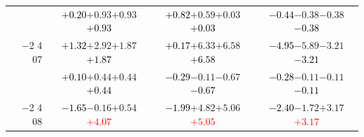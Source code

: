 \documentclass[compress]{beamer}
\begin{document}
\begin{frame}
\begin{tabular}{r | c | c | c}
          & \textcolor{black}{$+0.20$}\hspace{0.1 cm}$+0.93$\hspace{0.1 cm}$+0.93$\hspace{0.1 cm}\textcolor{black}{$+0.93$} & \textcolor{black}{$+0.82$}\hspace{0.1 cm}$+0.59$\hspace{0.1 cm}$+0.03$\hspace{0.1 cm}\textcolor{black}{$+0.03$} & \textcolor{black}{$-0.44$}\hspace{0.1 cm}$-0.38$\hspace{0.1 cm}$-0.38$\hspace{0.1 cm}\textcolor{black}{$-0.38$} \\
$-$2 4 07 & \textcolor{black}{$+1.32$}\hspace{0.1 cm}$+2.92$\hspace{0.1 cm}$+1.87$\hspace{0.1 cm}\textcolor{black}{$+1.87$} & \textcolor{black}{$+0.17$}\hspace{0.1 cm}$+6.33$\hspace{0.1 cm}$+6.58$\hspace{0.1 cm}\textcolor{black}{$+6.58$} & \textcolor{black}{$-4.95$}\hspace{0.1 cm}$-5.89$\hspace{0.1 cm}$-3.21$\hspace{0.1 cm}\textcolor{black}{$-3.21$} \\
          & \textcolor{black}{$+0.10$}\hspace{0.1 cm}$+0.44$\hspace{0.1 cm}$+0.44$\hspace{0.1 cm}\textcolor{black}{$+0.44$} & \textcolor{black}{$-0.29$}\hspace{0.1 cm}$-0.11$\hspace{0.1 cm}$-0.67$\hspace{0.1 cm}\textcolor{black}{$-0.67$} & \textcolor{black}{$-0.28$}\hspace{0.1 cm}$-0.11$\hspace{0.1 cm}$-0.11$\hspace{0.1 cm}\textcolor{black}{$-0.11$} \\
$-$2 4 08 & \textcolor{black}{$-1.65$}\hspace{0.1 cm}$-0.16$\hspace{0.1 cm}$+0.54$\hspace{0.1 cm}\textcolor{red}{$+4.07$} & \textcolor{black}{$-1.99$}\hspace{0.1 cm}$+4.82$\hspace{0.1 cm}$+5.06$\hspace{0.1 cm}\textcolor{red}{$+5.05$} & \textcolor{black}{$-2.40$}\hspace{0.1 cm}$-1.72$\hspace{0.1 cm}$+3.17$\hspace{0.1 cm}\textcolor{red}{$+3.17$} \\

\end{tabular}
\end{frame}
\end{document}
